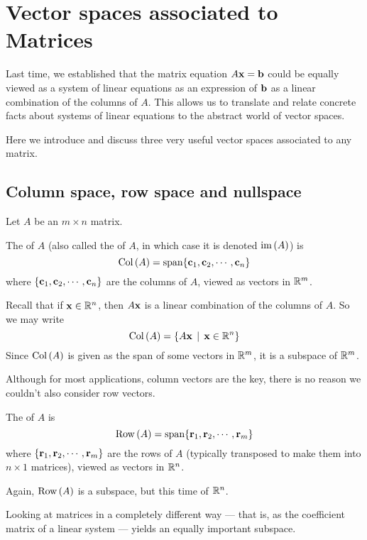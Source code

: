 \chapter{Vector spaces associated to Matrices}
\label{chapter:15homog}


Last time, we established that the matrix equation $A\mathbf{x} = \mathbf{b}$
could be equally viewed as a system of linear equations as an expression
of $\mathbf{b}$ as a linear combination of the columns of $A$.  This allows
us to translate and relate concrete facts about systems of linear equations to the
abstract world of vector spaces.

Here we introduce and discuss three very useful vector spaces associated to any matrix. 



\section{Column space, row space and nullspace}

Let $A$ be an $m \times n$ matrix.

\begin{definition}
The  of $A$ (also called the  of $A$, in which case it is denoted $\operatorname{im}\,(A)$) is
$$
\operatorname{Col\,}(A) = \textrm{span}\{ \mathbf{c}_1, \mathbf{c}_2, \cdots, \mathbf{c}_n\}
$$
where $\{ \mathbf{c}_1, \mathbf{c}_2, \cdots, \mathbf{c}_n\}$ are the columns
of $A$, viewed as vectors in $\mathbb{R}^m$.  
\end{definition}

Recall that if $\mathbf{x}\in \mathbb{R}^n$, then $A\mathbf{x}$ is a linear combination of the columns of $A$. So we may write
$$
\operatorname{Col\,}(A) = \{A\mathbf{x}\,\mid \, \mathbf{x}\in \mathbb{R}^n \}
$$
Since $\operatorname{Col\,}(A)$ is given as the span of some vectors in $\mathbb{R}^m$, it
is a subspace of $\mathbb{R}^m$.

Although for most applications, column vectors are the key, there is
no reason we couldn't also consider row vectors.

\begin{definition}
The  of $A$ is
$$
\operatorname{Row\,}(A) = \textrm{span}\{ \mathbf{r}_1, \mathbf{r}_2, \cdots, \mathbf{r}_m\}
$$
where $\{ \mathbf{r}_1, \mathbf{r}_2, \cdots, \mathbf{r}_m\}$ are the rows of $A$
(typically transposed to make them into $n\times 1$ matrices), 
viewed as vectors in $\mathbb{R}^n$.  
\end{definition}

Again, $\operatorname{Row\,}(A)$ is a subspace, but this time of $\mathbb{R}^n$.

Looking at matrices in a completely different way --- that is, as the coefficient matrix of a linear system --- yields an equally 
important subspace.

